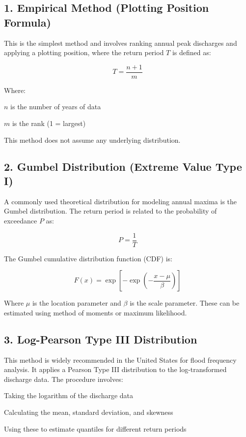 \documentclass{tufte-handout}\usepackage[]{graphicx}\usepackage[]{xcolor}
\newenvironment{itemize*}%
  {\begin{itemize}%
    \setlength{\itemsep}{0pt}%
    \setlength{\parskip}{0pt}}%
  {\end{itemize}}
\begin{document}
\subsection{1. Empirical Method (Plotting Position Formula)}

This is the simplest method and involves ranking annual peak discharges and applying a plotting position, where the return period \( T \) is defined as:

\[
T = \frac{n + 1}{m}
\]


\noindent Where:
\begin{itemize*}
  \item \( n \) is the number of years of data
  \item \( m \) is the rank (1 = largest)
\end{itemize*}

This method does not assume any underlying distribution.

\subsection{2. Gumbel Distribution (Extreme Value Type I)}

A commonly used theoretical distribution for modeling annual maxima is the Gumbel distribution. The return period is related to the probability of exceedance \( P \) as:

\[
P = \frac{1}{T}
\]

The Gumbel cumulative distribution function (CDF) is:

\[
F(x) = \exp\left[-\exp\left(-\frac{x - \mu}{\beta}\right)\right]
\]

Where \( \mu \) is the location parameter and \( \beta \) is the scale parameter. These can be estimated using method of moments or maximum likelihood.

\subsection{3. Log-Pearson Type III Distribution}

This method is widely recommended in the United States for flood frequency analysis. It applies a Pearson Type III distribution to the log-transformed discharge data. The procedure involves:

\begin{itemize*}
  \item Taking the logarithm of the discharge data
  \item Calculating the mean, standard deviation, and skewness
  \item Using these to estimate quantiles for different return periods
\end{itemize*}
\end{document}
